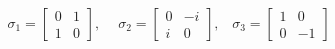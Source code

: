 \begin{equation}
\sigma _{1}=\left[ 
\begin{array}{cc}
0 & 1 \\ 
1 & 0
\end{array}
\right] ,\;\;\ \ \ \sigma _{2}=\left[ 
\begin{array}{cc}
0 & -i \\ 
i & 0
\end{array}
\right] ,\;\;\;\sigma _{3}=\left[ 
\begin{array}{cc}
1 & 0 \\ 
0 & -1
\end{array}
\right]
\end{equation}

